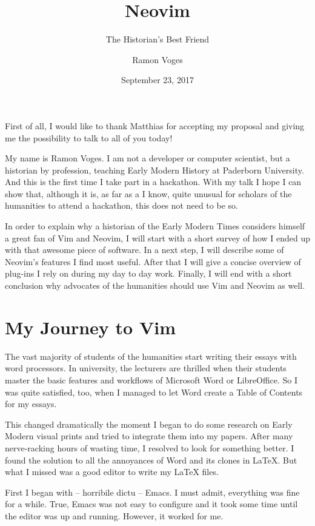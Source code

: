 \documentclass[DIV=calc, a4paper, fontsize=12pt, headings=normal, parskip=half]{scrartcl}
\begin{document}
\title{Neovim}
\subtitle{The Historian's Best Friend}
\subject{Vimfest 2017}
\date{\normalsize September 23, 2017}
\author{\normalsize Ramon Voges}

\maketitle

First of all, I would like to thank Matthias for accepting my proposal
and giving me the possibility to talk to all of you today!

My name is Ramon Voges. I am not a developer or computer scientist, but
a historian by profession, teaching Early Modern History at Paderborn University. And this is the first time I take part in a hackathon. With my
talk I hope I can show that, although it is, as far as a I know, quite
unusual for scholars of the humanities to attend a hackathon, this does
not need to be so.

In order to explain why a historian of the Early Modern Times considers
himself a great fan of Vim and Neovim, I will start with a short survey
of how I ended up with that awesome piece of software. In a next step, I
will describe some of Neovim's features I find most useful. After that I
will give a concise overview of plug-ins I rely on during my day to day
work. Finally, I will end with a short conclusion why advocates of the
humanities should use Vim and Neovim as well.

\section{My Journey to Vim}\label{my-journey-to-vim}

The vast majority of students of the humanities start writing their
essays with word processors. In university, the lecturers are thrilled
when their students master the basic features and workflows of Microsoft
Word or LibreOffice. So I was quite satisfied, too, when I managed to
let Word create a Table of Contents for my essays.

This changed dramatically the moment I began to do some research on
Early Modern visual prints and tried to integrate them into my papers.
After many nerve-racking hours of wasting time, I resolved to look for
something better. I found the solution to all the annoyances of Word and
its clones in LaTeX. But what I missed was a good editor to write my
LaTeX files.

First I began with – horribile dictu – Emacs. I must admit, everything
was fine for a while. True, Emacs was not easy to configure and it took
some time until the editor was up and running. However, it worked for
me.
\end{document}

